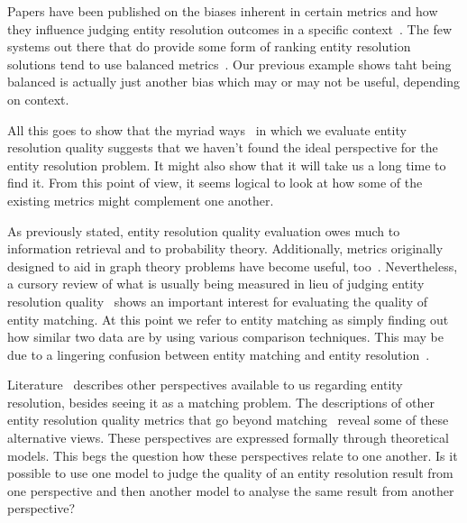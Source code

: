 Papers have been published on the biases inherent in certain metrics
and how they influence judging entity resolution outcomes in a specific
context~\cite{Goga2015}.
The few systems out there that do provide some form of ranking entity
resolution solutions tend to use balanced metrics~\cite{papwithcode2019}.
Our previous example shows taht being balanced is actually just another bias
which may or may not be useful, depending on context.

All this goes to show that the myriad ways~\cite{hitesh2012} in which we
evaluate entity resolution quality suggests that we haven't found the ideal
perspective for the entity resolution problem.
It might also show that it will take us a long time to find it.
From this point of view, it seems logical to look at how some of the existing
metrics might complement one another.

As previously stated, entity resolution quality evaluation owes much to
information retrieval and to probability theory.
Additionally, metrics originally designed to aid in graph theory problems have
become useful, too~\cite{hitesh2012,Kon19}.
Nevertheless, a cursory review of what is usually being measured in lieu of
judging entity resolution quality~\cite{fever2009,Men10,Goga2015} shows an
important interest for evaluating the quality of entity matching.
At this point we refer to entity matching as simply finding out how similar two
data are by using various comparison techniques.
This may be due to a lingering confusion between entity matching and entity
resolution~\cite{Tal11}.

Literature~\cite{Tal11} describes other perspectives available to us regarding
entity resolution, besides seeing it as a matching problem.
The descriptions of other entity resolution quality metrics that go beyond
matching~\cite{Men10,tal2007algebraic} reveal some of these alternative
views.
These perspectives are expressed formally through theoretical
models\cite{Ben2009Swoosh,Tal11}.
This begs the question how these perspectives relate to one another.
Is it possible to use one model to judge the quality of an entity resolution
result from one perspective and then another model to analyse the same result
from another perspective?
